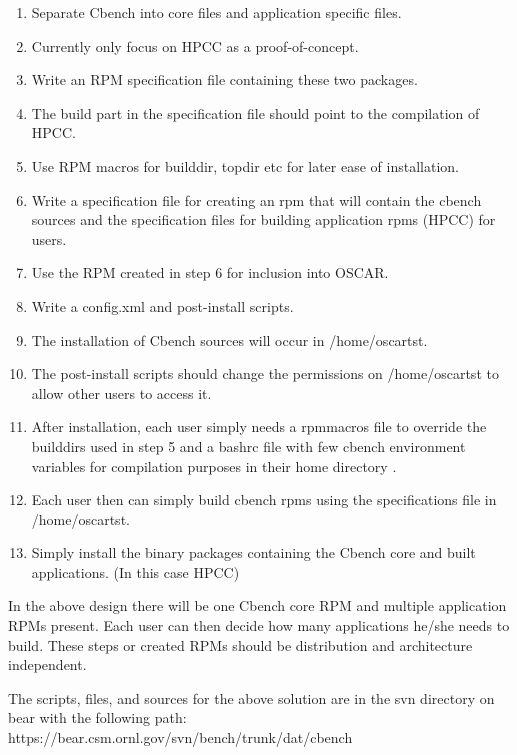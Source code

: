 \documentclass[pdftex,10pt]{article}
\begin{document}
\begin{enumerate}
\item Separate Cbench into core files and application specific files.
\item Currently only focus on HPCC as a proof-of-concept.
\item Write an RPM specification file containing these two packages.
\item The build part in the specification file should point to the compilation of HPCC.
\item Use RPM macros for builddir, topdir etc for later ease of installation.
\item Write a specification file for creating an rpm that will contain the cbench sources and the specification files for building application rpms (HPCC) for users.
\item Use the RPM created in step 6 for inclusion into OSCAR.
\item Write a config.xml and post-install scripts.
\item The installation of Cbench sources will occur in /home/oscartst.
\item The post-install scripts should change the permissions on /home/oscartst to allow other users to access it.
\item After installation, each user simply needs a rpmmacros file to override the builddirs used in step 5 and a bashrc file with few cbench environment variables for compilation purposes in their home directory . 
\item Each user then can simply build cbench rpms using the specifications file in /home/oscartst.
\item Simply install the binary packages containing the Cbench core and built applications. (In this case HPCC)
\end{enumerate}

In the above design there will be one Cbench core RPM and multiple application RPMs present. Each user can then decide how many applications he/she needs to build. These steps or created RPMs should be distribution and architecture independent.

The scripts, files, and sources for the above solution are in the svn directory on bear with the following path: https://bear.csm.ornl.gov/svn/bench/trunk/dat/cbench
\end{document}
